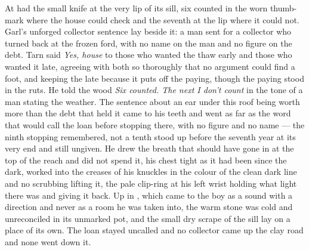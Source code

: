 At   had the small knife at the very lip of its sill, six counted in the worn thumb-mark where the house could check and the seventh at the lip where it could not. Garl's unforged collector sentence lay beside it: a man sent for a collector who turned back at the frozen ford, with no name on the man and no figure on the debt. Tarn said \emph{Yes, house} to those who wanted the thaw early and those who wanted it late, agreeing with both so thoroughly that no argument could find a foot, and keeping the late because it puts off the paying, though the paying stood in the ruts. He told the wood \emph{Six counted. The next I don't count} in the tone of a man stating the weather. The sentence about an ear under this roof being worth more than the debt that held it came to his teeth and went as far as the word that would call the loan before stopping there, with no figure and no name --- the ninth stopping remembered, not a tenth stood up before the seventh year at its very end and still ungiven. He drew the breath that should have gone in at the top of the reach and did not spend it, his chest tight as it had been since the dark,  worked into the creases of his knuckles in the colour of the clean dark line and no scrubbing lifting it, the pale clip-ring at his left wrist holding what light there was and giving it back. Up in , which came to the boy as a sound with a direction and never as a room he was taken into, the warm stone was cold and unreconciled in its unmarked pot, and the small dry scrape of the sill lay on a place of its own. The loan stayed uncalled and no collector came up the clay road and none went down it.

